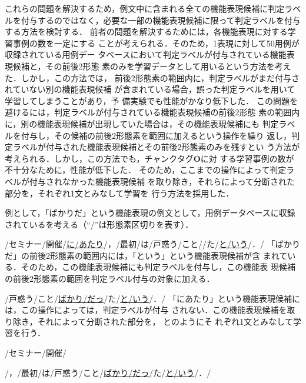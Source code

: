 \documentclass[japanese]{jnlp_1.2d}
\newcounter{example}
\newenvironment{example}{}{}
\newcommand{\strref}[1]{}
\begin{document}
これらの問題を解決するため，例文中に含まれる全ての機能表現候補に判定ラベ
ルを付与するのではなく，必要な一部の機能表現候補に限って判定ラベルを付与
する方法を検討する．
前者の問題を解決するためには，各機能表現に対する学習事例の数を一定にする
ことが考えられる．そのため，1表現に対して50用例が収録されている用例デー
タベースにおいて判定ラベルが付与されている機能表現候補と，その前後2形態
素のみを学習データとして用いるという方法を考えた．しかし，この方法では，
前後2形態素の範囲内に，判定ラベルがまだ付与されていない別の機能表現候補
が含まれている場合，誤った判定ラベルを用いて学習してしまうことがあり，予
備実験でも性能がかなり低下した．
この問題を避けるには，判定ラベルが付与されている機能表現候補の前後2形態
素の範囲内に，別の機能表現候補が出現していた場合は，その機能表現候補にも
判定ラベルを付与し，その候補の前後2形態素を範囲に加えるという操作を繰り
返し，判定ラベルが付与された機能表現候補とその前後2形態素のみを残すとい
う方法が考えられる．しかし，この方法でも，チャンクタグ{\bfseries O}に対
する学習事例の数が不十分なために，性能が低下した．
そのため，ここまでの操作によって判定ラベルが付与されなかった機能表現候補
を取り除き，それらによって分断された部分を，それぞれ1文とみなして学習を
行う方法を採用した．

例として，「ばかりだ」という機能表現の例文として，用例データベースに収録
されている\strref{ex:bakarida}を考える（``/''は形態素区切りを表す）．
\begin{example}
  \item /セミナー/開催/\underline{に/あたり}/，/最初/は/戸惑う/こと//た/\underline{と/いう}/．/
	\label{ex:bakarida}
\end{example}
「ばかりだ」の前後2形態素の範囲内には，「という」という機能表現候補が含
まれている．そのため，この機能表現候補にも判定ラベルを付与し，この機能表
現候補の前後2形態素の範囲を判定ラベル付与の対象に加える．
\begin{example}
  \item /戸惑う/こと/\underline{ばかり/だっ}/た/\underline{と/いう}/．/
\end{example}
「にあたり」という機能表現候補には，この操作によっては，判定ラベルが付与
されない．この機能表現候補を取り除き，それによって分断された部分を，
\strref{ex:divided_sentence_1}と\strref{ex:divided_sentence_2}のようにそ
れぞれ1文とみなして学習を行う．
\begin{example}
  \item /セミナー/開催/ \label{ex:divided_sentence_1}
  \item /，/最初/は/戸惑う/こと/\underline{ばかり/だっ}/た/\underline{と/いう}/．/
	\label{ex:divided_sentence_2}
\end{example}
\end{document}
